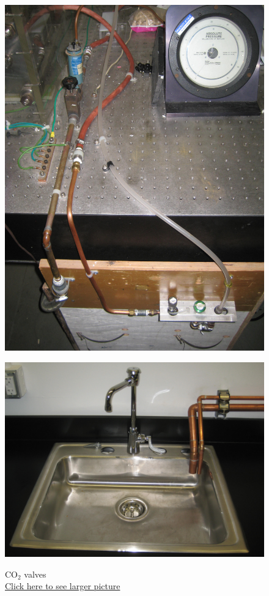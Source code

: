 \documentclass{../lab}
\begin{document}
\begin{figure}[H]
  \href{http://experimentationlab.berkeley.edu/sites/default/files/images/CO2_Valves_3568.jpg}{\includegraphics[width=\linewidth,keepaspectratio]{images/CO2_Valves_3568.jpg}}
  \caption{CO$_2$ valves\\ \href{http://experimentationlab.berkeley.edu/sites/default/files/images/CO2_Valves_3568.jpg}{Click here to see larger picture}}
  \label{fig:CO2Valves}
\endminipage\hfill
{}
  \href{http://experimentationlab.berkeley.edu/sites/default/files/images/Water_Drains_3531.jpg}{\includegraphics[width=\linewidth,keepaspectratio]{images/Water_Drains_3531.jpg}}

\end{figure}
\end{document}
